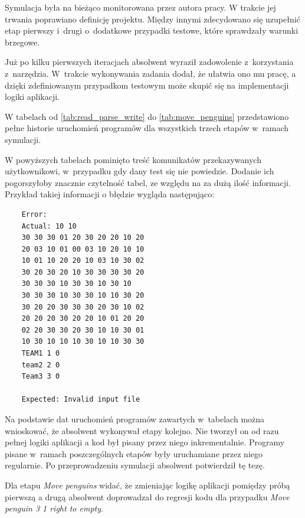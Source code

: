 Symulacja była na bieżąco monitorowana przez autora pracy.
W trakcie jej trwania poprawiano definicję projektu.
Między innymi zdecydowano się uzupełnić etap pierwszy i~drugi o~dodatkowe przypadki testowe, które sprawdzały warunki brzegowe.

Już po kilku pierwszych iteracjach absolwent wyraził zadowolenie z~korzystania z~narzędzia.
W~trakcie wykonywania zadania dodał, że ułatwia ono mu pracę, a dzięki zdefiniowanym przypadkom testowym może skupić się na implementacji logiki aplikacji.

W tabelach od \ref{tab:read_parse_write} do \ref{tab:move_penguins} przedstawiono pełne historie uruchomień programów dla wszystkich trzech etapów w~ramach symulacji.









W powyższych tabelach pominięto treść komunikatów przekazywanych użytkownikowi, w~przypadku gdy dany test się nie powiedzie.
Dodanie ich pogorszyłoby znacznie czytelność tabel, ze względu na za dużą ilość informacji.
Przykład takiej informacji o błędzie wygląda następująco:

{\selectfont
\tiny
\begin{lstlisting}
    Error:
    Actual: 10 10
    30 30 30 01 20 30 20 20 10 20
    20 03 10 01 00 03 10 20 10 10
    10 01 10 20 20 10 03 10 30 02
    30 20 30 20 10 30 30 30 30 20
    30 30 30 10 30 30 10 30 10
    30 30 30 10 30 30 10 10 30 20
    30 20 20 30 30 30 20 30 10 02
    20 20 20 30 20 20 10 01 20 20
    02 20 30 30 20 30 10 10 30 01
    10 30 10 10 10 30 10 10 30 30
    TEAM1 1 0
    team2 2 0
    Team3 3 0

    Expected: Invalid input file
\end{lstlisting}
}

Na podstawie dat uruchomień programów zawartych w~tabelach można wnioskować, że absolwent wykonywał etapy kolejno.
Nie tworzył on od razu pełnej logiki aplikacji a kod był pisany przez niego inkrementalnie.
Programy pisane w~ramach poszczególnych etapów były uruchamiane przez niego regularnie.
Po przeprowadzeniu symulacji absolwent potwierdził tę tezę.

Dla etapu \textit{Move penguins} widać, że zmieniając logikę aplikacji pomiędzy próbą pierwszą a drugą absolwent doprowadzał do regresji kodu dla przypadku \textit{Move penguin 3 1 right to empty}.

